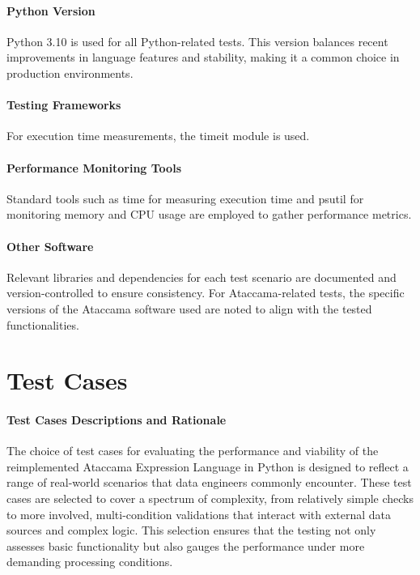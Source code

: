     \paragraph{Python Version} Python 3.10 is used for all Python-related tests. This version balances recent improvements in language features and stability, making it a common choice in production environments.
    
    \paragraph{Testing Frameworks} For execution time measurements, the timeit module is used.
    \paragraph{Performance Monitoring Tools} Standard tools such as time for measuring execution time and psutil for monitoring memory and CPU usage are employed to gather performance metrics.
    \paragraph{Other Software} Relevant libraries and dependencies for each test scenario are documented and version-controlled to ensure consistency. For Ataccama-related tests, the specific versions of the Ataccama software used are noted to align with the tested functionalities.

\section{Test Cases}


\paragraph{Test Cases Descriptions and Rationale}

The choice of test cases for evaluating the performance and viability of the reimplemented Ataccama Expression Language in Python is designed to reflect a range of real-world scenarios that data engineers commonly encounter. These test cases are selected to cover a spectrum of complexity, from relatively simple checks to more involved, multi-condition validations that interact with external data sources and complex logic. This selection ensures that the testing not only assesses basic functionality but also gauges the performance under more demanding processing conditions.

